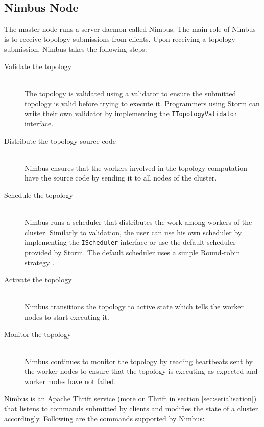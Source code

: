 \documentclass[bsc,twoside,singlespacing,normalheadings,parskip]{infthesis}\usepackage[]{graphicx}\usepackage[]{color}
\begin{document}
\subsection{Nimbus Node}

The master node runs a server daemon called Nimbus. The main role of Nimbus is to receive topology submissions from clients. Upon receiving a topology submission, Nimbus takes the following steps:

\begin{description}
	\item[Validate the topology] \hfill \\
	The topology is validated using a validator to ensure the submitted topology is valid before trying to execute it. Programmers using Storm can write their own validator by implementing the \texttt{ITopologyValidator} interface.
	\item[Distribute the topology source code] \hfill \\
	Nimbus ensures that the workers involved in the topology computation have the source code by sending it to all nodes of the cluster.
	\item[Schedule the topology] \hfill \\
	Nimbus runs a scheduler that distributes the work among workers of the cluster. Similarly to validation, the user can use his own scheduler by implementing the \texttt{IScheduler} interface or use the default scheduler provided by Storm. The default scheduler uses a simple Round-robin strategy \citep{Aniello_Baldoni_Querzoni_2013}.
	\item[Activate the topology] \hfill \\
	Nimbus transitions the topology to active state which tells the worker nodes to start executing it.
	\item[Monitor the topology] \hfill \\
	Nimbus continues to monitor the topology by reading heartbeats sent by the worker nodes to ensure that the topology is executing as expected and worker nodes have not failed.
\end{description}


Nimbus is an Apache Thrift \cite{ApacheThrift} service (more on Thrift in section \ref{sec:serialisation}) that listens to commands submitted by clients and modifies the state of a cluster accordingly. Following are the commands supported by Nimbus:
\end{document}
